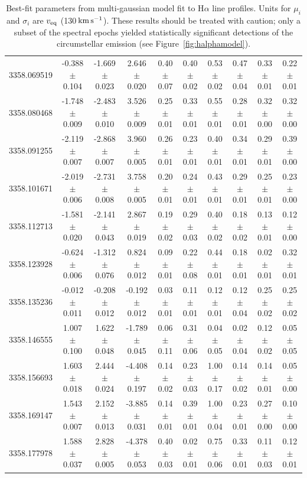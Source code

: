 \documentclass[11pt,twocolumn,tighten,linenumbers]{aastex7}
\newcommand{\kms}{\ensuremath{\rm km\,s^{-1}}}
\begin{document}
\begin{table}
\begin{tabular}{lccccccccc}
  3358.069519 & -0.388 $\pm$ 0.104 & -1.669 $\pm$ 0.023 & 2.646 $\pm$ 0.020 & 0.40 $\pm$ 0.07 & 0.40 $\pm$ 0.02 & 0.53 $\pm$ 0.02 & 0.47 $\pm$ 0.04 & 0.33 $\pm$ 0.01 & 0.22 $\pm$ 0.01 \\
  3358.080468 & -1.748 $\pm$ 0.009 & -2.483 $\pm$ 0.010 & 3.526 $\pm$ 0.009 & 0.25 $\pm$ 0.01 & 0.33 $\pm$ 0.01 & 0.55 $\pm$ 0.01 & 0.28 $\pm$ 0.01 & 0.32 $\pm$ 0.00 & 0.32 $\pm$ 0.00 \\
  3358.091255 & -2.119 $\pm$ 0.007 & -2.868 $\pm$ 0.007 & 3.960 $\pm$ 0.005 & 0.26 $\pm$ 0.01 & 0.23 $\pm$ 0.01 & 0.40 $\pm$ 0.01 & 0.34 $\pm$ 0.01 & 0.29 $\pm$ 0.01 & 0.39 $\pm$ 0.00 \\
  3358.101671 & -2.019 $\pm$ 0.006 & -2.731 $\pm$ 0.008 & 3.758 $\pm$ 0.005 & 0.20 $\pm$ 0.01 & 0.24 $\pm$ 0.01 & 0.43 $\pm$ 0.01 & 0.29 $\pm$ 0.01 & 0.25 $\pm$ 0.01 & 0.23 $\pm$ 0.00 \\
  3358.112713 & -1.581 $\pm$ 0.020 & -2.141 $\pm$ 0.043 & 2.867 $\pm$ 0.019 & 0.19 $\pm$ 0.02 & 0.29 $\pm$ 0.03 & 0.40 $\pm$ 0.02 & 0.18 $\pm$ 0.02 & 0.13 $\pm$ 0.01 & 0.12 $\pm$ 0.00 \\
  3358.123928 & -0.624 $\pm$ 0.006 & -1.312 $\pm$ 0.076 & 0.824 $\pm$ 0.012 & 0.09 $\pm$ 0.01 & 0.22 $\pm$ 0.08 & 0.44 $\pm$ 0.01 & 0.18 $\pm$ 0.01 & 0.02 $\pm$ 0.01 & 0.32 $\pm$ 0.01 \\
  3358.135236 & -0.012 $\pm$ 0.011 & -0.208 $\pm$ 0.012 & -0.192 $\pm$ 0.012 & 0.03 $\pm$ 0.01 & 0.11 $\pm$ 0.01 & 0.12 $\pm$ 0.01 & 0.12 $\pm$ 0.04 & 0.25 $\pm$ 0.02 & 0.25 $\pm$ 0.02 \\
  3358.146555 & 1.007 $\pm$ 0.100 & 1.622 $\pm$ 0.048 & -1.789 $\pm$ 0.045 & 0.06 $\pm$ 0.11 & 0.31 $\pm$ 0.06 & 0.04 $\pm$ 0.05 & 0.02 $\pm$ 0.04 & 0.12 $\pm$ 0.02 & 0.05 $\pm$ 0.05 \\
  3358.156693 & 1.603 $\pm$ 0.018 & 2.444 $\pm$ 0.024 & -4.408 $\pm$ 0.197 & 0.14 $\pm$ 0.02 & 0.23 $\pm$ 0.03 & 1.00 $\pm$ 0.17 & 0.14 $\pm$ 0.02 & 0.14 $\pm$ 0.01 & 0.05 $\pm$ 0.00 \\
  3358.169147 & 1.543 $\pm$ 0.007 & 2.152 $\pm$ 0.013 & -3.885 $\pm$ 0.031 & 0.14 $\pm$ 0.01 & 0.39 $\pm$ 0.01 & 1.00 $\pm$ 0.04 & 0.23 $\pm$ 0.01 & 0.27 $\pm$ 0.00 & 0.10 $\pm$ 0.00 \\
  3358.177978 & 1.588 $\pm$ 0.037 & 2.828 $\pm$ 0.005 & -4.378 $\pm$ 0.053 & 0.40 $\pm$ 0.03 & 0.02 $\pm$ 0.01 & 0.75 $\pm$ 0.06 & 0.33 $\pm$ 0.01 & 0.11 $\pm$ 0.03 & 0.12 $\pm$ 0.01 \\
  \hline
  \end{tabular}
  \caption{Best-fit parameters from multi-gaussian model fit to H$\alpha$ line
  profiles.  Units for $\mu_i$ and $\sigma_i$ are $v_{\rm eq}$
  (130\,\kms). These results should be treated with caution; only a
  subset of the spectral epochs yielded statistically significant
  detections of the circumstellar emission (see
  Figure~\ref{fig:halphamodel}).}
  \label{tab:halphamodelparams}
\end{table}



\clearpage




\end{document}

